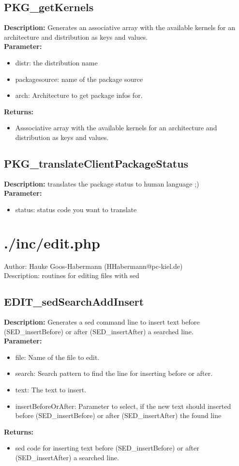 \subsection{PKG\_getKernels}
\textbf{Description:} Generates an associative array with the available kernels for an architecture and distribution as keys and values.\\
\textbf{Parameter:}
\begin{itemize}
\item distr: the distribution name
\item packagesource: name of the package source
\item arch: Architecture to get package infos for.
\end{itemize}
\textbf{Returns:}
\begin{itemize}
\item Asssociative array with the available kernels for an architecture and distribution as keys and values.
\end{itemize}

\subsection{PKG\_translateClientPackageStatus}
\textbf{Description:} translates the package status to human language ;)\\
\textbf{Parameter:}
\begin{itemize}
\item status: status code you want to translate
\end{itemize}

\newpage\section{./inc/edit.php}
 Author: Hauke Goos-Habermann (HHabermann@pc-kiel.de)\\
 Description: routines for editing files with sed\\

\subsection{EDIT\_sedSearchAddInsert}
\textbf{Description:} Generates a sed command line to insert text before (SED\_insertBefore) or after (SED\_insertAfter) a searched line.\\
\textbf{Parameter:}
\begin{itemize}
\item file: Name of the file to edit.
\item search: Search pattern to find the line for inserting before or after.
\item text: The text to insert.
\item insertBeforeOrAfter: Parameter to select, if the new text should inserted before (SED\_insertBefore) or after (SED\_insertAfter) the found line
\end{itemize}
\textbf{Returns:}
\begin{itemize}
\item sed code for inserting text before (SED\_insertBefore) or after (SED\_insertAfter) a searched line.
\end{itemize}

